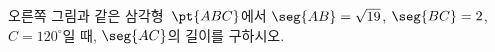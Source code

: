 \noindent\begin{minipage}[t]{0.58\linewidth}\vspace{0pt}\raggedright 오른쪽 그림과 같은 삼각형~$\pt{ABC}$에서 $\seg{AB}=\sqrt{19}$, $\seg{BC}=2$, $C=120^\circ$일 때, $\seg{AC}$의 길이를 구하시오.\end{minipage}\hfill\begin{minipage}[t]{0.4\linewidth}\vspace{0pt}\centering \resizebox{\ifdim\width>\linewidth\linewidth\else\width\fi}{!}{}\end{minipage}\par
